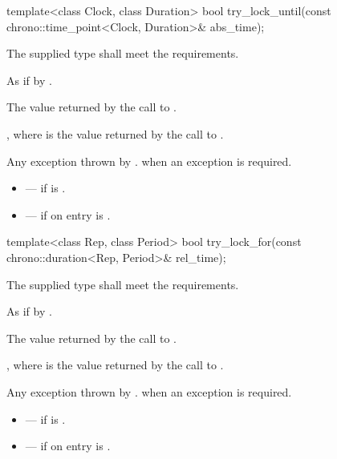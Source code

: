 %
\begin{itemdecl}
template<class Clock, class Duration>
  bool try_lock_until(const chrono::time_point<Clock, Duration>& abs_time);
\end{itemdecl}

\begin{itemdescr}
\pnum
\requires The supplied  type shall meet the 
requirements.

\pnum
\effects As if by .

\pnum
\returns The value returned by the call to .

\pnum
\ensures {}, where  is the value returned by
the call to .

\pnum
\throws Any exception thrown by .  when an
exception is required.

\pnum
\errors
\begin{itemize}
\item {} --- if  is .
\item {} --- if on entry  is
.
\end{itemize}
\end{itemdescr}

%
\begin{itemdecl}
template<class Rep, class Period>
  bool try_lock_for(const chrono::duration<Rep, Period>& rel_time);
\end{itemdecl}

\begin{itemdescr}
\pnum
\requires The supplied  type shall meet the  requirements.

\pnum
\effects As if by .

\pnum
\returns The value returned by the call to .

\pnum
\ensures {}, where  is the value returned by the call to .

\pnum
\throws Any exception thrown by .  when an
exception is required.

\pnum
\errors
\begin{itemize}
\item {} --- if  is .
\item {} --- if on entry  is
.
\end{itemize}
\end{itemdescr}

